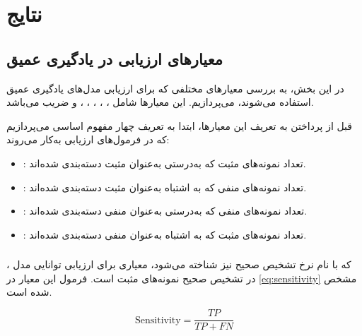 \chapter{نتایج}
\section{معیارهای ارزیابی در یادگیری عمیق}

در این بخش، به بررسی معیارهای مختلفی که برای ارزیابی مدل‌های یادگیری عمیق استفاده می‌شوند، می‌پردازیم. این معیارها شامل ، ، ، ، ،  و ضریب  می‌باشد.

قبل از پرداختن به تعریف این معیارها، ابتدا به تعریف چهار مفهوم اساسی می‌پردازیم که در فرمول‌های ارزیابی به‌کار می‌روند:

\begin{itemize}
    \item \textbf{ }: تعداد نمونه‌های مثبت که به‌درستی به‌عنوان مثبت دسته‌بندی شده‌اند.
    \item \textbf{ }: تعداد نمونه‌های منفی که به اشتباه به‌عنوان مثبت دسته‌بندی شده‌اند.
    \item \textbf{ }: تعداد نمونه‌های منفی که به‌درستی به‌عنوان منفی دسته‌بندی شده‌اند.
    \item \textbf{ }: تعداد نمونه‌های مثبت که به اشتباه به‌عنوان منفی دسته‌بندی شده‌اند.
\end{itemize}

\subsection{}

، که با نام نرخ تشخیص صحیح نیز شناخته می‌شود، معیاری برای ارزیابی توانایی مدل در تشخیص صحیح نمونه‌های مثبت است. فرمول این معیار در \autoref{eq:sensitivity} مشخص شده است.

\begin{latin}
\begin{equation}
\label{eq:sensitivity}
\text{Sensitivity} = \frac{TP}{TP + FN}
\end{equation}
\end{latin}

\subsection{}

